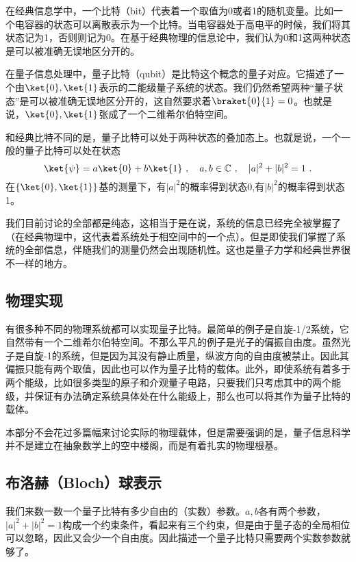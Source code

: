 

在经典信息学中，一个比特（bit）代表着一个取值为0或者1的随机变量。比如一个电容器的状态可以离散表示为一个比特。当电容器处于高电平的时候，我们将其状态记为1，否则则记为0。在基于经典物理的信息论中，我们认为0和1这两种状态是可以被准确无误地区分开的。

在量子信息处理中，量子比特（qubit）是比特这个概念的量子对应。它描述了一个由$\ket{0},\ket{1}$表示的二能级量子系统的状态。我们仍然希望两种“量子状态”是可以被准确无误地区分开的，这自然要求着$\braket{0}{1}=0$。也就是说，$\ket{0},\ket{1}$张成了一个二维希尔伯特空间。

和经典比特不同的是，量子比特可以处于两种状态的叠加态上。也就是说，一个一般的量子比特可以处在状态
\begin{equation}
\ket{\psi}=a\ket{0}+b\ket{1}~,\quad a,b\in\mathbb{C}~,\quad |a|^2+|b|^2=1~.
\end{equation}
在$\{\ket{0},\ket{1}\}$基的测量下，有$|a|^2$的概率得到状态0,有$|b|^2$的概率得到状态1。

我们目前讨论的全部都是纯态，这相当于是在说，系统的信息已经完全被掌握了（在经典物理中，这代表着系统处于相空间中的一个点）。但是即使我们掌握了系统的全部信息，伴随我们的测量仍然会出现随机性。这也是量子力学和经典世界很不一样的地方。



\subsection{物理实现}

有很多种不同的物理系统都可以实现量子比特。最简单的例子是自旋-1/2系统，它自然带有一个二维希尔伯特空间。不那么平凡的例子是光子的偏振自由度。虽然光子是自旋-1的系统，但是因为其没有静止质量，纵波方向的自由度被禁止。因此其偏振只能有两个取值，因此也可以作为量子比特的载体。此外，即使系统有着多于两个能级，比如很多类型的原子和介观量子电路，只要我们只考虑其中的两个能级，并保证有办法确定系统具体处在什么能级上，那么也可以将其作为量子比特的载体。

本部分不会花过多篇幅来讨论实际的物理载体，但是需要强调的是，量子信息科学并不是建立在抽象数学上的空中楼阁，而是有着扎实的物理根基。

\subsection{布洛赫（Bloch）球表示}

我们来数一数一个量子比特有多少自由的（实数）参数。$a,b$各有两个参数，$|a|^2+|b|^2=1$构成一个约束条件，看起来有三个约束，但是由于量子态的全局相位可以忽略，因此又会少一个自由度。因此描述一个量子比特只需要两个实数参数就够了。

